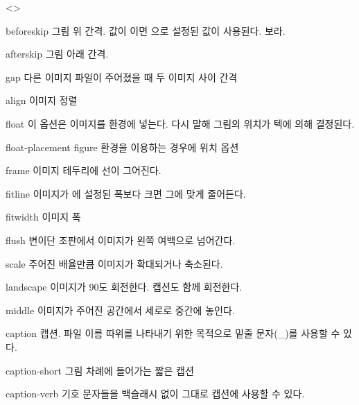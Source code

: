 \documentclass[minted]{hzguide}
\begin{document}
\begin{macros}<\ImageSetup>
\item[beforeskip] \keyvalue{\hznulldim, 0.5\onelineskip}
그림 위 간격. 
값이 \macro{\hznulldim}이면 \macro{\ObjectSetup}으로 설정된 값이 사용된다.
\를 보라.

\item[afterskip] \keyvalue{\hznulldim, 0.5\onelineskip}
그림 아래 간격. 

\item[gap] \keyvalue{1em}
다른 이미지 파일이 주어졌을 때 두 이미지 사이 간격

\item[align] \keyvalue{\raggedleft, \centering, \raggedright}
이미지 정렬

\item[float] \keyvalueTF
이 옵션은 이미지를  환경에 넣는다. 다시 말해 그림의 위치가 텍에 의해 결정된다.

\item[float-placement] 
figure 환경을 이용하는 경우에 위치 옵션

\item[frame] \keyvalueTF
이미지 테두리에 선이 그어진다.

\item[fitline] \keyvalueTF
이미지가 에 설정된 폭보다 크면 그에 맞게 줄어든다.

\item[fitwidth] \keyvalue{\linewidth}
이미지 폭

\item[flush] \keyvalueTF
변이단 조판에서 이미지가 왼쪽 여백으로 넘어간다.

\item[scale] 
주어진 배율만큼 이미지가 확대되거나 축소된다.

\item[landscape] \keyvalueTF
이미지가 90도 회전한다. 캡션도 함께 회전한다.

\item[middle] \keyvalueTF
이미지가 주어진 공간에서 세로로 중간에 놓인다.

\item[caption] 
캡션. 파일 이름 따위를 나타내기 위한 목적으로 밑줄 문자(\_)를 사용할 수 있다.

\item[caption-short] 
그림 차례에 들어가는 짧은 캡션

\item[caption-verb] \keyvalueTF
기호 문자들을 백슬래시 없이 그대로 캡션에 사용할 수 있다.


\end{macros}
\end{document}
